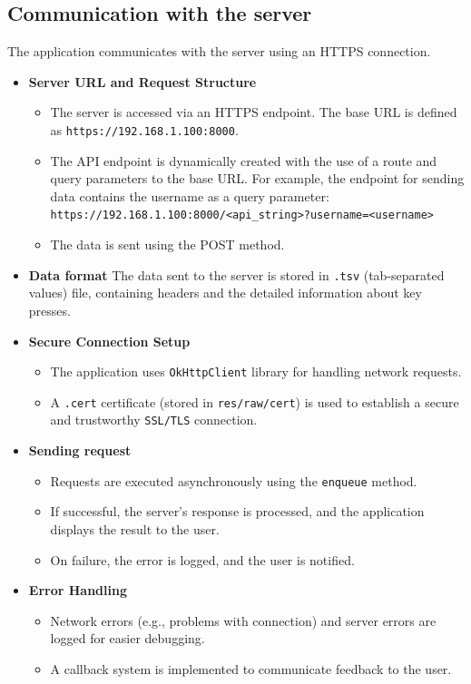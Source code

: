 \subsection{Communication with the server}

The application communicates with the server using an HTTPS connection.
\begin{itemize}
	\item 
	\textbf{Server URL and Request Structure}
	\begin{itemize}
		\item 
		The server is accessed via an HTTPS endpoint. The base URL is defined as \newline \texttt{https://192.168.1.100:8000}.
		\item 
		The API endpoint is dynamically created with the use of a route and query parameters to the base URL. For example, the endpoint for sending data contains the username as a query parameter: \newline
		\texttt{https://192.168.1.100:8000/<api\_string>?username=<username>}
		\item 
		The data is sent using the POST method.
	\end{itemize}
	\item
	\textbf{Data format} \newline
	The data sent to the server is stored in \texttt{.tsv} (tab-separated values) file, containing headers and the detailed information about key presses.
	\item 
	\textbf{Secure Connection Setup}
	\begin{itemize}
		\item 
		The application uses \texttt{OkHttpClient} library for handling network requests.
		\item 
		A \texttt{.cert} certificate (stored in \texttt{res/raw/cert}) is used to establish a secure and trustworthy \texttt{SSL/TLS} connection.
	\end{itemize}
	\item 
	\textbf{Sending request}
	\begin{itemize}
		\item 
		Requests are executed asynchronously using the \texttt{enqueue} method.
		\item 
		If successful, the server's response is processed, and the application displays the result to the user.
		\item 
		On failure, the error is logged, and the user is notified.  
	\end{itemize}
	\item 
	\textbf{Error Handling}
	\begin{itemize}
		\item 
		Network errors (e.g., problems with connection) and server errors are logged for easier debugging.
		\item 
		A callback system is implemented to communicate feedback to the user. 
	\end{itemize}
	
	
\end{itemize}


